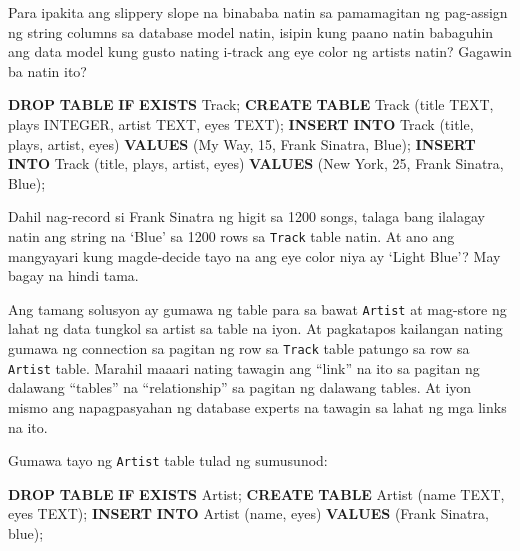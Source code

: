 \documentclass[10pt,]{book}
\newenvironment{Shaded}{}{}
\newcommand{\ControlFlowTok}[1]{\textcolor[rgb]{0.00,0.44,0.13}{\textbf{#1}}}
\newcommand{\DataTypeTok}[1]{\textcolor[rgb]{0.56,0.13,0.00}{#1}}
\newcommand{\DecValTok}[1]{\textcolor[rgb]{0.25,0.63,0.44}{#1}}
\newcommand{\KeywordTok}[1]{\textcolor[rgb]{0.00,0.44,0.13}{\textbf{#1}}}
\newcommand{\NormalTok}[1]{#1}
\newcommand{\StringTok}[1]{\textcolor[rgb]{0.25,0.44,0.63}{#1}}
\begin{document}
Para ipakita ang slippery slope na binababa natin sa pamamagitan ng
pag-assign ng string columns sa database model natin, isipin kung paano
natin babaguhin ang data model kung gusto nating i-track ang eye color
ng artists natin? Gagawin ba natin ito?

\begin{Shaded}
\begin{Highlighting}[]
\KeywordTok{DROP} \KeywordTok{TABLE} \ControlFlowTok{IF} \KeywordTok{EXISTS}\NormalTok{ Track;}
\KeywordTok{CREATE} \KeywordTok{TABLE}\NormalTok{ Track (title TEXT, plays }\DataTypeTok{INTEGER}\NormalTok{,}
\NormalTok{    artist TEXT, eyes TEXT);}
\KeywordTok{INSERT} \KeywordTok{INTO}\NormalTok{ Track (title, plays, artist, eyes)}
    \KeywordTok{VALUES}\NormalTok{ (}\StringTok{\textquotesingle{}My Way\textquotesingle{}}\NormalTok{, }\DecValTok{15}\NormalTok{, }\StringTok{\textquotesingle{}Frank Sinatra\textquotesingle{}}\NormalTok{, }\StringTok{\textquotesingle{}Blue\textquotesingle{}}\NormalTok{);}
\KeywordTok{INSERT} \KeywordTok{INTO}\NormalTok{ Track (title, plays, artist, eyes)}
    \KeywordTok{VALUES}\NormalTok{ (}\StringTok{\textquotesingle{}New York\textquotesingle{}}\NormalTok{, }\DecValTok{25}\NormalTok{, }\StringTok{\textquotesingle{}Frank Sinatra\textquotesingle{}}\NormalTok{, }\StringTok{\textquotesingle{}Blue\textquotesingle{}}\NormalTok{);}
\end{Highlighting}
\end{Shaded}

Dahil nag-record si Frank Sinatra ng higit sa 1200 songs, talaga bang
ilalagay natin ang string na `Blue' sa 1200 rows sa \texttt{Track} table
natin. At ano ang mangyayari kung magde-decide tayo na ang eye color
niya ay `Light Blue'? May bagay na hindi tama.

Ang tamang solusyon ay gumawa ng table para sa bawat \texttt{Artist} at
mag-store ng lahat ng data tungkol sa artist sa table na iyon. At
pagkatapos kailangan nating gumawa ng connection sa pagitan ng row sa
\texttt{Track} table patungo sa row sa \texttt{Artist} table. Marahil
maaari nating tawagin ang ``link'' na ito sa pagitan ng dalawang
``tables'' na ``relationship'' sa pagitan ng dalawang tables. At iyon
mismo ang napagpasyahan ng database experts na tawagin sa lahat ng mga
links na ito.

Gumawa tayo ng \texttt{Artist} table tulad ng sumusunod:

\begin{Shaded}
\begin{Highlighting}[]
\KeywordTok{DROP} \KeywordTok{TABLE} \ControlFlowTok{IF} \KeywordTok{EXISTS}\NormalTok{ Artist;}
\KeywordTok{CREATE} \KeywordTok{TABLE}\NormalTok{ Artist (name TEXT, eyes TEXT);}
\KeywordTok{INSERT} \KeywordTok{INTO}\NormalTok{ Artist (name, eyes)}
   \KeywordTok{VALUES}\NormalTok{ (}\StringTok{\textquotesingle{}Frank Sinatra\textquotesingle{}}\NormalTok{, }\StringTok{\textquotesingle{}blue\textquotesingle{}}\NormalTok{);}
\end{Highlighting}
\end{Shaded}
\end{document}
